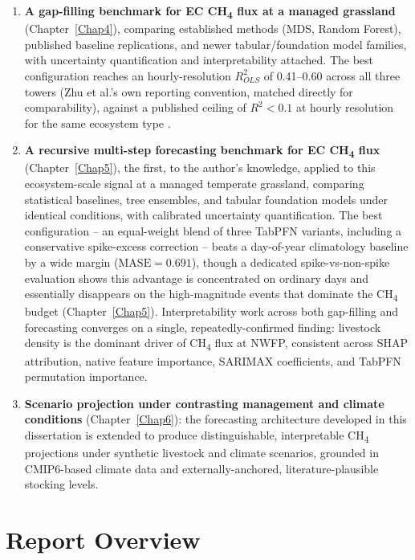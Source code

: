 \begin{enumerate}
    \item \textbf{A gap-filling benchmark for EC CH\textsubscript{4} flux at a managed
    grassland} (Chapter~\ref{Chap4}), comparing established methods (MDS, Random Forest),
    published baseline replications, and newer tabular/foundation model families, with
    uncertainty quantification and interpretability attached. The best configuration reaches an
    hourly-resolution $R^2_{OLS}$ of 0.41--0.60 across all three towers (Zhu et al.'s own reporting
    convention, matched directly for comparability), against a published ceiling of $R^2<0.1$ at
    hourly resolution for the same ecosystem type \cite{zhu2023a}.

    \item \textbf{A recursive multi-step forecasting benchmark for EC CH\textsubscript{4} flux}
    (Chapter~\ref{Chap5}), the first, to the author's knowledge, applied to this ecosystem-scale
    signal at a managed temperate grassland, comparing statistical baselines, tree ensembles, and
    tabular foundation models under identical conditions, with calibrated uncertainty
    quantification. The best configuration -- an equal-weight blend of three TabPFN variants,
    including a conservative spike-excess correction -- beats a day-of-year climatology baseline by
    a wide margin ($\text{MASE}=0.691$), though a dedicated spike-vs-non-spike evaluation shows this
    advantage is concentrated on ordinary days and essentially disappears on the high-magnitude
    events that dominate the CH\textsubscript{4} budget (Chapter~\ref{Chap5}). Interpretability
    work across both gap-filling and forecasting
    converges on a single, repeatedly-confirmed finding: livestock density is the dominant driver
    of CH\textsubscript{4} flux at NWFP, consistent across SHAP attribution, native feature
    importance, SARIMAX coefficients, and TabPFN permutation importance.

    \item \textbf{Scenario projection under contrasting management and climate conditions}
    (Chapter~\ref{Chap6}): the forecasting architecture developed in this dissertation is
    extended to produce distinguishable, interpretable CH\textsubscript{4} projections under
    synthetic livestock and climate scenarios, grounded in CMIP6-based climate data and
    externally-anchored, literature-plausible stocking levels.
\end{enumerate}

\section{Report Overview}


